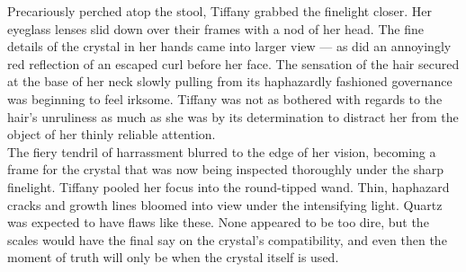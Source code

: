 Precariously perched atop the stool, Tiffany grabbed the finelight closer.
Her eyeglass lenses slid down over their frames with a nod of her head.
The fine details of the crystal in her hands came into larger view --- as did an annoyingly red reflection of an escaped curl before her face.
The sensation of the hair secured at the base of her neck slowly pulling from its haphazardly fashioned governance was beginning to feel irksome.
Tiffany was not as bothered with regards to the hair's unruliness as much as she was by its determination to distract her from the object of her thinly reliable attention.\\

The fiery tendril of harrassment blurred to the edge of her vision, becoming a frame for the crystal that was now being inspected thoroughly under the sharp finelight.
Tiffany pooled her focus into the round-tipped wand.
Thin, haphazard cracks and growth lines bloomed into view under the intensifying light.
Quartz was expected to have flaws like these.
None appeared to be too dire, but the scales would have the final say on the crystal's compatibility, and even then the moment of truth will only be when the crystal itself is used.\\



